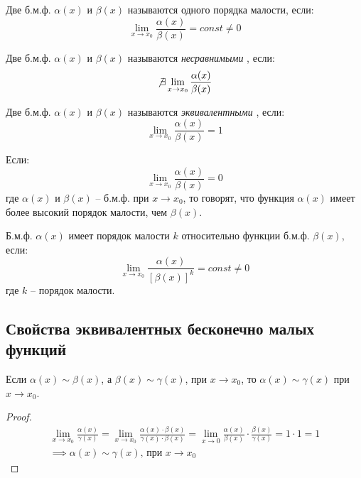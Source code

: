 \begin{definition}
  Две б.м.ф. $\alpha(x)$ и $\beta(x)$ называются одного порядка малости, если: \[
  \lim_{x \to x_0} \frac{\alpha(x)}{\beta(x)} = const \neq 0
  \] 
\end{definition}

\begin{definition}
  Две б.м.ф. $\alpha(x)$ и $\beta(x)$ называются \textit{несравнимыми} , если: \[
  \not \exists \lim_{x \to x_0} \frac{\alpha(x)}{\beta(x)}
  \] 
\end{definition}

\begin{definition}
  Две б.м.ф. $\alpha(x)$ и $\beta(x)$ называются \textit{эквивалентными} , если: \[
  \lim_{x \to x_0} \frac{\alpha(x)}{\beta(x)} = 1
  \] 
\end{definition}


\begin{definition}
  Если: \[
  \lim_{x \to x_0} \frac{\alpha(x)}{\beta(x)} = 0
  \]
  где $\alpha(x)$ и $\beta(x)$ -- б.м.ф. при $x \to x_0$, то говорят, что функция $\alpha(x)$ имеет более высокий порядок малости, чем $\beta(x)$.
\end{definition}

\begin{definition}
  Б.м.ф. $\alpha(x)$ имеет порядок малости $k$ относительно функции б.м.ф.  $\beta(x)$, если: \[
    \lim_{x \to x_0} \frac{\alpha(x)}{[\beta(x)]^k} = const \neq 0
  \]
  где $k$ -- порядок малости.
\end{definition}

\subsection{Свойства эквивалентных бесконечно малых функций}

\begin{theorem}
  Если $\alpha(x) \sim \beta(x)$, а $\beta(x) \sim \gamma(x)$, при $x \to x_0$, то $\alpha(x) \sim \gamma(x)$ при $x \to x_0$.
\end{theorem}
\begin{proof}
  \begin{gather*}
    \lim_{x \to x_0} \frac{\alpha(x)}{\gamma(x)} = \lim_{x \to x_0} \frac{\alpha(x) \cdot \beta(x)}{\gamma(x) \cdot \beta(x)}
    = \lim_{x \to 0} \frac{\alpha(x)}{\beta(x)} \cdot \frac{\beta(x)}{\gamma(x)}
    = 1 \cdot 1 = 1 \\
    \implies \alpha(x) \sim \gamma(x) \text{, при } x \to x_0
  \end{gather*}
\end{proof}

